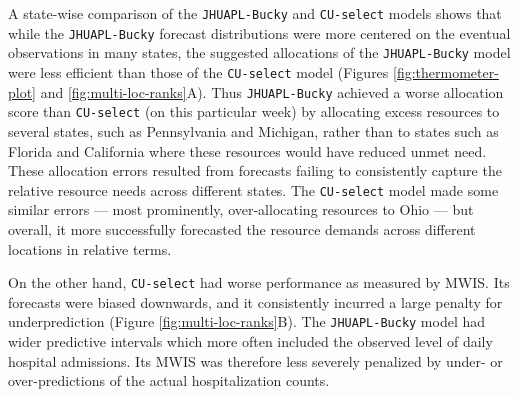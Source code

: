 \documentclass{article}\usepackage[]{graphicx}\usepackage[]{xcolor}
\begin{document}
A state-wise comparison of the
\texttt{JHUAPL-Bucky} and \texttt{CU-select} models shows that while the \texttt{JHUAPL-Bucky} forecast distributions
were more centered on the eventual observations in many states, the suggested allocations of the \texttt{JHUAPL-Bucky}
model were less efficient than those of the \texttt{CU-select} model (Figures \ref{fig:thermometer-plot} and \ref{fig:multi-loc-ranks}A). Thus \texttt{JHUAPL-Bucky} achieved a worse
allocation score than \texttt{CU-select} (on this particular week) by allocating excess resources to several states,
such as Pennsylvania and Michigan, rather than to states such as Florida and California where these resources would have
reduced unmet need.  These allocation errors resulted from forecasts failing to consistently
capture the relative resource needs across different states. The \texttt{CU-select} model made some similar errors —
most prominently, over-allocating resources to Ohio — but overall, it more successfully forecasted the resource demands
across different locations in relative terms.

On the other hand, \texttt{CU-select} had worse performance as measured by MWIS. Its forecasts were biased downwards,
and it consistently incurred a large penalty for underprediction (Figure \ref{fig:multi-loc-ranks}B). The
\texttt{JHUAPL-Bucky} model had wider predictive intervals which more often included the observed level of daily
hospital admissions. Its MWIS was therefore less severely penalized by under- or over-predictions of the actual
hospitalization counts.
\end{document}
